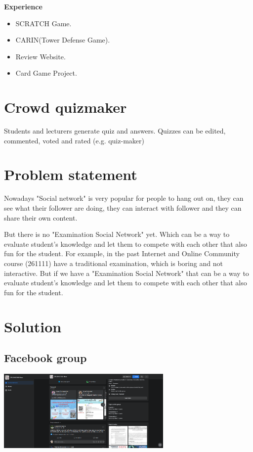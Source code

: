 \documentclass[a4paper, 12pt]{report}
\begin{document}
\begin{itemize}
                \textbf{Experience}
                \begin{itemize}
                    \item SCRATCH Game.
                    \item CARIN(Tower Defense Game).
                    \item Review Website.
                    \item Card Game Project.
                \end{itemize}

        \end{itemize}

    \pagebreak
    \section*{Crowd quizmaker}
    Students and lecturers generate quiz and answers. Quizzes can be edited, commented, voted and rated (e.g. quiz-maker)

    \section*{Problem statement}
    
    Nowadays "Social network" is very popular for people to hang out on, they can see what their follower are doing, they can interact with follower and they can share their own content.

    But there is no "Examination Social Network" yet. Which can be a way to evaluate student's knowledge and let them to compete with each other that also fun for the student. For example, in the past Internet and Online Community course (261111) have a traditional examination, which is boring and not interactive. But if we have a "Examination Social Network" that can be a way to evaluate student's knowledge and let them to compete with each other that also fun for the student.
    
    \pagebreak
    \section*{Solution}

    \subsection*{Facebook group}
    \begin{center}
        \includegraphics[height=150px]{facebook_group.png}
    \end{center}
\end{document}
